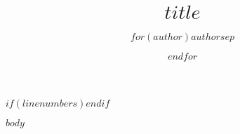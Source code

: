 \documentclass[11pt,a4paper,DIV=12]{scrartcl}
\title{$title$}
\author{$for(author)$$author$$sep$ \and $endfor$}
\date{}
\begin{document}
\renewcommand{\thefootnote}{\fnsymbol{footnote}}
\setcounter{footnote}{1}

\renewcommand{\thefootnote}{\arabic{footnote}}
\setcounter{footnote}{0}

\maketitle


\pagestyle{plain} %
\setcounter{page}{1}

$if(linenumbers)$\linenumbers$endif$

$body$
\end{document}
